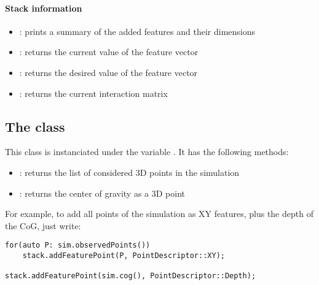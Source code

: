 \documentclass{ecnreport}
\begin{document}
\paragraph{Stack information}
\begin{itemize}
 \item  {}: prints a summary of the added features and their dimensions
 \item  {}: returns the current value of the feature vector
  \item  {}: returns the desired value of the feature vector
   \item  {}: returns the current interaction matrix
 \end{itemize}


\subsection{The  class}\label{app:sim}

This class is instanciated under the variable . It has the following methods:
\begin{itemize}
 \item {}: returns the list of considered 3D points in the simulation
 \item {}: returns the center of gravity as a 3D point
\end{itemize}

For example, to add all points of the simulation as XY features, plus the depth of the CoG, just write:

\begin{center}\cppstyle
\begin{lstlisting}
for(auto P: sim.observedPoints())
    stack.addFeaturePoint(P, PointDescriptor::XY);
    
stack.addFeaturePoint(sim.cog(), PointDescriptor::Depth);
\end{lstlisting}
\end{center}
\end{document}

